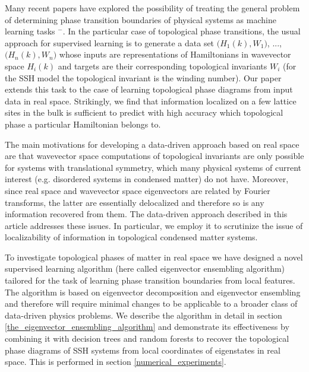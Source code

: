 \documentclass[10pt]{revtex4-1}
\begin{document}
Many recent papers have explored the possibility of treating the general problem of determining phase transition boundaries of physical systems as machine learning tasks \cite{carrasquilla2017machine}$^-$\cite{rodriguez2018identifying}. In the particular case of topological phase transitions, the usual approach for supervised learning is to generate a data set $\big(H_1(k), W_1\big)$, ..., $\big(H_n(k), W_n\big)$ whose inputs are representations of Hamiltonians in wavevector space $H_i(k)$ and targets are their corresponding topological invariants $W_i$ (for the SSH model the topological invariant is the winding number). Our paper extends this task to the case of learning topological phase diagrams from input data in real space. Strikingly, we find that information localized on a few lattice sites in the bulk is sufficient to predict with high accuracy which topological phase a particular Hamiltonian belongs to.

The main motivations for developing a data-driven approach based on real space are that wavevector space computations of topological invariants are only possible for systems with translational symmetry, which many physical systems of current interest (e.g. disordered systems in condensed matter) do not have. Moreover, since real space and wavevector space eigenvectors are related by Fourier transforms, the latter are essentially delocalized and therefore so is any information recovered from them. The data-driven approach described in this article addresses these issues. In particular, we employ it to scrutinize the issue of localizability of information in topological condensed matter systems.

To investigate topological phases of matter in real space we have designed a novel supervised learning algorithm (here called eigenvector ensembling algorithm) tailored for the task of learning phase transition boundaries from local features. The algorithm is based on eigenvector decomposition and eigenvector ensembling and therefore will require minimal changes to be applicable to a broader class of data-driven physics problems. We describe the algorithm in detail in section \ref{the_eigenvector_ensembling_algorithm} and demonstrate its effectiveness by combining it with decision trees and random forests to recover the topological phase diagrams of SSH systems from local coordinates of eigenstates in real space. This is performed in section \ref{numerical_experiments}.
\end{document}
